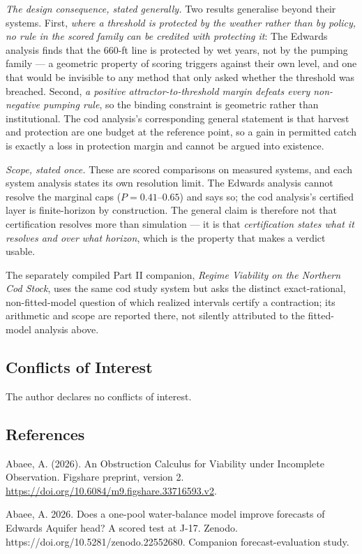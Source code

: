 \documentclass[11pt]{article}
\begin{document}
\emph{The design consequence, stated generally.} Two results generalise beyond their systems. First,
\emph{where a threshold is protected by the weather rather than by policy, no rule in the scored
family can be credited with protecting it}: The Edwards analysis finds that the 660-ft line is protected by wet
years, not by the pumping family --- a geometric property of scoring triggers against their own
level, and one that would be invisible to any method that only asked whether the threshold was
breached. Second, \emph{a positive attractor-to-threshold margin defeats every non-negative pumping
rule}, so the binding constraint is geometric rather than institutional. The cod analysis's corresponding
general statement is that harvest and protection are one budget at the reference point, so a gain in
permitted catch is exactly a loss in protection margin and cannot be argued into existence.

\emph{Scope, stated once.} These are scored comparisons on measured systems, and each system analysis states
its own resolution limit. The Edwards analysis cannot resolve the marginal caps ($P = 0.41$--$0.65$) and says so;
the cod analysis's certified layer is finite-horizon by construction. The general claim is therefore not that
certification resolves more than simulation --- it is that \emph{certification states what it
resolves and over what horizon}, which is the property that makes a verdict usable.

\noindent The separately compiled Part II companion, \emph{Regime Viability on the Northern Cod Stock},
uses the same cod study system but asks the distinct exact-rational, non-fitted-model
question of which realized intervals certify a contraction; its arithmetic and scope
are reported there, not silently attributed to the fitted-model analysis above.

\subsection*{Conflicts of Interest}
The author declares no conflicts of interest.

\subsection*{References}
\label{references}
Abaee, A. (2026). An Obstruction Calculus for Viability under Incomplete Observation. Figshare preprint, version 2. \url{https://doi.org/10.6084/m9.figshare.33716593.v2}.

Abaee, A. 2026. Does a one-pool water-balance model improve forecasts of
Edwards Aquifer head? A scored test at J-17. Zenodo.
https://doi.org/10.5281/zenodo.22552680. Companion forecast-evaluation
study.
\end{document}
